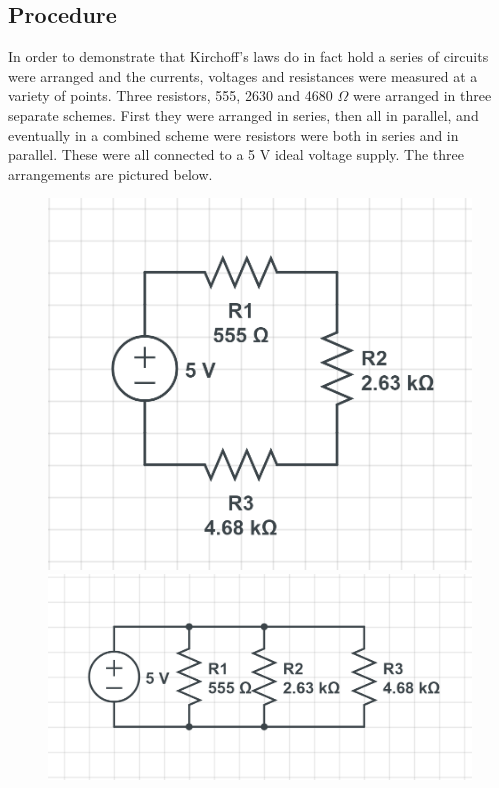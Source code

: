 \documentclass[11pt]{article}
\begin{document}
\subsection{Procedure}
	In order to demonstrate that Kirchoff's laws do in fact hold a series of circuits were arranged and the currents, voltages and resistances were measured at a variety of points. Three resistors, 555, 2630 and 4680 \( \Omega\) were arranged in three separate schemes. First they were arranged in series, then all in parallel, and eventually in a combined scheme were resistors were both in series and in parallel. These were all connected to a 5 V ideal voltage supply. The three arrangements are pictured below.
\begin{figure}[h]
	\begin{center}
		\includegraphics[scale=0.3]{S1}
		\includegraphics[scale=0.3]{S2}

\end{center}
\end{figure}
\end{document}
